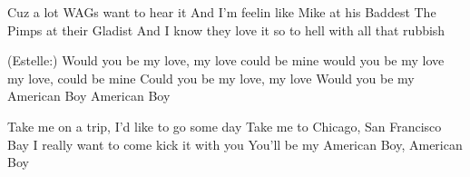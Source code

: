 Cuz a lot WAGs want to hear it
And I'm feelin like Mike at his Baddest
The Pimps at their Gladist
And I know they love it
so to hell with all that rubbish

(Estelle:)
Would you be my love, my love
could be mine would you be my love my love, could be mine
Could you be my love, my love
Would you be my American Boy
American Boy

Take me on a trip, I'd like to go some day
Take me to Chicago, San Francisco Bay
I really want to come kick it with you
You'll be my American Boy, American Boy

